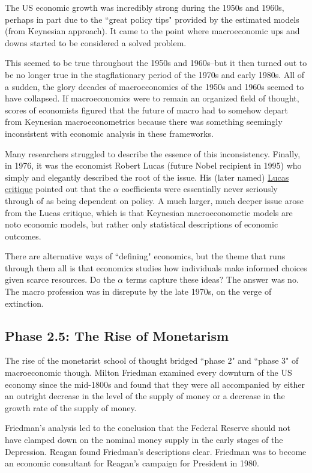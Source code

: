 \documentclass[10pt]{article}
\begin{document}
The US economic growth was incredibly strong during the 1950s and 1960s, perhaps in part due to 
the ``great policy tips" provided by the estimated models (from Keynesian approach). It came to the
point where macroeconomic ups and downs started to be considered a solved problem.

This seemed to be true throughout the 1950s and 1960s--but it then turned out to be no longer
true in the stagflationary period of the 1970s and early 1980s. All of a sudden, the glory decades of macroeconomics of the 1950s and 1960s seemed to have collapsed. If macroeconomics were to remain an organized field of thought, scores of economists figured that the future of macro had to somehow depart from Keynesian macroeconometrics because there was something seemingly inconsistent with economic analysis in these frameworks.

Many researchers struggled to describe the essence of this inconsistency. Finally, in 1976, it was the economist Robert Lucas (future Nobel recipient in 1995) who simply and elegantly described the root of the issue. His (later named) {\underline {Lucas critique}} pointed out that the $ \alpha $
coefficients were essentially never seriously through of as being dependent on policy.
A much larger, much deeper issue arose from the Lucas critique, which is that Keynesian 
macroeconometic models are noto economic models, but rather only statistical descriptions
of economic outcomes.

There are alternative ways of ``defining" economics, but the theme that runs through them all is that
economics studies how individuals make informed choices given scarce resources. Do the $ \alpha $
terms capture these ideas? The answer was no. The macro profession was in disrepute by the late
1970s, on the verge of extinction.


\subsection{Phase 2.5: The Rise of Monetarism}
The rise of the monetarist school of thought bridged ``phase 2" and ``phase 3" of macroeconomic
though. Milton Friedman examined every downturn of the US economy since the mid-1800s and found that
they were all accompanied by either an outright decrease in the level of the supply of money or
a decrease in the growth rate of the supply of money.

Friedman's analysis led to the conclusion that the Federal Reserve should not have clamped down on the
nominal money supply in the early stages of the Depression.
Reagan found Friedman's descriptions clear. Friedman was to become an economic consultant
for Reagan's campaign for President in 1980.
\end{document}
